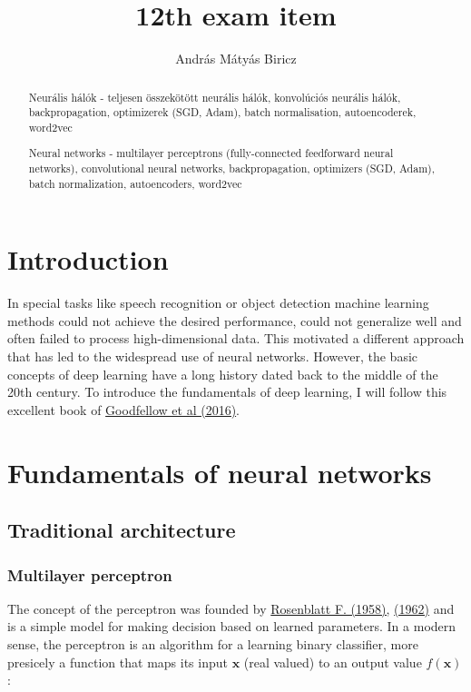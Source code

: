 \documentclass[12pt]{article}
\theoremstyle{plain}
\begin{document}
\title{12th exam item}
\author{András Mátyás Biricz}

\maketitle


\newpage
\begin{abstract}
    Neurális hálók - teljesen összekötött neurális hálók, konvolúciós neurális hálók, backpropagation, optimizerek (SGD, Adam), batch normalisation, autoencoderek, word2vec
    
    Neural networks - multilayer perceptrons (fully-connected feedforward neural networks), convolutional neural networks, backpropagation, optimizers (SGD, Adam), batch normalization, autoencoders, word2vec
\end{abstract}

\section{Introduction}

In special tasks like speech recognition or object detection machine learning methods could not achieve the desired performance, could not generalize well and often failed to process high-dimensional data. This motivated a different approach that has led to the widespread use of neural networks. However, the basic concepts of deep learning have a long history dated back to the middle of the 20th century. To introduce the fundamentals of deep learning, I will follow this excellent book of \hyperlink{Deeplea_Goodfellow}{Goodfellow et al (2016)}.

\section{Fundamentals of neural networks}

\subsection{Traditional architecture}

\subsubsection{Multilayer perceptron}

The concept of the perceptron was founded by \hyperlink{Deeplea_Rosenblatt_1}{Rosenblatt F. (1958),} \hyperlink{Deeplea_Rosenblatt_2}{(1962)} and is a simple model for making decision based on learned parameters. In a modern sense, the perceptron is an algorithm for a learning binary classifier, more presicely a function that maps its input $\textbf{x}$ (real valued) to an output value $f(\textbf{x})$:
\end{document}
